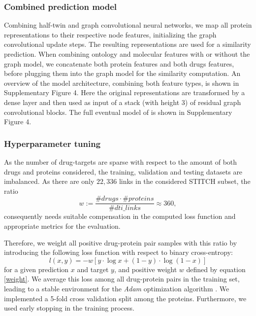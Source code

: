 \documentclass{bioinfo}
\begin{document}

\subsubsection{Combined prediction model}
Combining half-twin and graph convolutional neural networks, we map
all protein representations to their respective node features,
initializing the graph convolutional update steps. The resulting
representations are used for a similarity prediction.
When combining ontology and molecular features with or without the
graph model, we concatenate both protein features and both drugs
features, before plugging them into the graph model for the similarity
computation. An overview of the model architecture, combining both
feature types, is shown in Supplementary Figure
4. Here
the original representations are transformed by a dense layer and then
used as input of a stack (with height 3) of residual graph
convolutional blocks. The full eventual model of \name{} is shown in Supplementary Figure 4.

\subsubsection{Hyperparameter tuning}
As the number of drug-targets are sparse with respect to the amount of
both drugs and proteins considered, the training, validation and
testing datasets are imbalanced. As there are only $22,336$ links in
the considered STITCH subset, the ratio
\begin{equation}
	w:= \frac{\#drugs \cdot \#proteins}{\#dti\_links} \approx 360,
	\label{weight}
\end{equation}
consequently needs suitable compensation in the computed loss function and
appropriate metrics for the evaluation.

Therefore, we weight all positive drug-protein pair samples with this
ratio by introducing the following loss function with respect to 
binary cross-entropy:
\begin{equation}
	l(x,y) = - w \left[ y \cdot \log x + (1 - y) \cdot \log (1 - x) \right]
\end{equation}
for a given prediction $x$ and target $y$, and positive weight $w$
defined by equation \eqref{weight}. We average this loss among all
drug-protein pairs in the training set, leading to a stable
environment for the \textit{Adam} optimization algorithm
\citep{Adam2014}. We implemented a 5-fold cross validation split among
the proteins. Furthermore, we used early stopping in the training
process.
\end{document}
